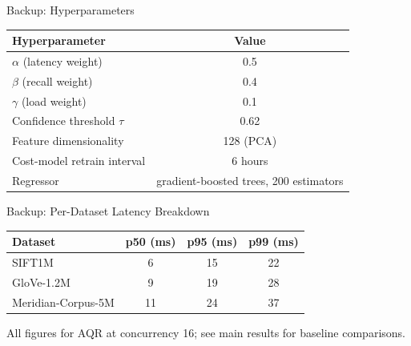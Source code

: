 \begin{frame}{Backup: Hyperparameters}
\small
\renewcommand{\arraystretch}{1.2}
\begin{center}
\begin{tabular}{lc}
\toprule
\textbf{Hyperparameter} & \textbf{Value} \\
\midrule
$\alpha$ (latency weight) & 0.5 \\
$\beta$ (recall weight) & 0.4 \\
$\gamma$ (load weight) & 0.1 \\
Confidence threshold $\tau$ & 0.62 \\
Feature dimensionality & 128 (PCA) \\
Cost-model retrain interval & 6 hours \\
Regressor & gradient-boosted trees, 200 estimators \\
\bottomrule
\end{tabular}
\end{center}
\end{frame}

\begin{frame}{Backup: Per-Dataset Latency Breakdown}
\small
\renewcommand{\arraystretch}{1.2}
\begin{center}
\begin{tabular}{lccc}
\toprule
\textbf{Dataset} & \textbf{p50 (ms)} & \textbf{p95 (ms)} & \textbf{p99 (ms)} \\
\midrule
SIFT1M & 6 & 15 & 22 \\
GloVe-1.2M & 9 & 19 & 28 \\
Meridian-Corpus-5M & 11 & 24 & 37 \\
\bottomrule
\end{tabular}
\end{center}
\vspace{0.2cm}
\footnotesize All figures for AQR at concurrency 16; see main results for baseline comparisons.
\end{frame}
